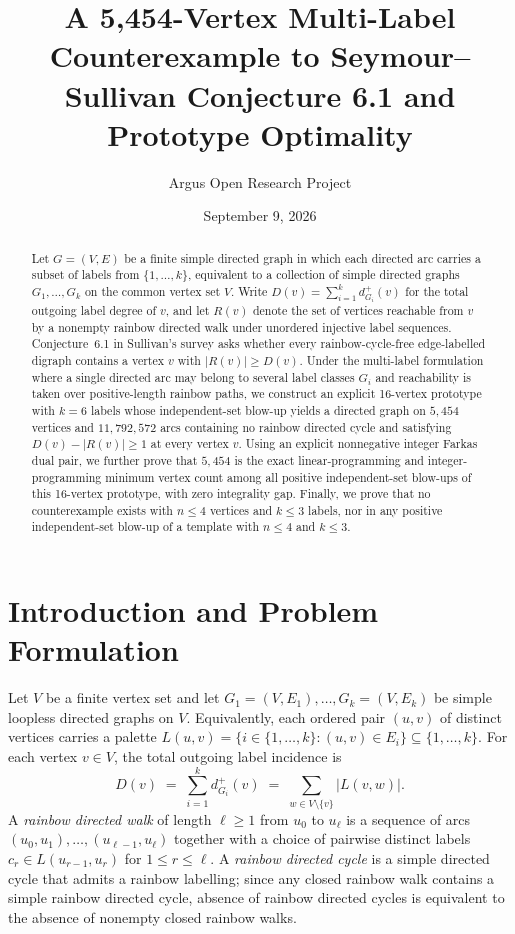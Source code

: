 \documentclass[10pt,reqno]{amsart}
\title[A 5,454-Vertex Counterexample to Sullivan's Conjecture 6.1]
{A 5,454-Vertex Multi-Label Counterexample to Seymour--Sullivan Conjecture 6.1 and Prototype Optimality}
\author{Argus Open Research Project}
\date{September 9, 2026}
\theoremstyle{definition}
\begin{document}
\begin{abstract}
Let $G=(V,E)$ be a finite simple directed graph in which each directed arc carries a subset of labels from $\{1,\dots,k\}$, equivalent to a collection of simple directed graphs $G_1,\dots,G_k$ on the common vertex set $V$. Write $D(v)=\sum_{i=1}^k d^+_{G_i}(v)$ for the total outgoing label degree of $v$, and let $R(v)$ denote the set of vertices reachable from $v$ by a nonempty rainbow directed walk under unordered injective label sequences. Conjecture~6.1 in Sullivan's survey asks whether every rainbow-cycle-free edge-labelled digraph contains a vertex $v$ with $|R(v)|\ge D(v)$. Under the multi-label formulation where a single directed arc may belong to several label classes $G_i$ and reachability is taken over positive-length rainbow paths, we construct an explicit 16-vertex prototype with $k=6$ labels whose independent-set blow-up yields a directed graph on $5{,}454$ vertices and $11{,}792{,}572$ arcs containing no rainbow directed cycle and satisfying $D(v)-|R(v)|\ge 1$ at every vertex $v$. Using an explicit nonnegative integer Farkas dual pair, we further prove that $5{,}454$ is the exact linear-programming and integer-programming minimum vertex count among all positive independent-set blow-ups of this 16-vertex prototype, with zero integrality gap. Finally, we prove that no counterexample exists with $n\le 4$ vertices and $k\le 3$ labels, nor in any positive independent-set blow-up of a template with $n\le 4$ and $k\le 3$.
\end{abstract}

\maketitle

\section{Introduction and Problem Formulation}

Let $V$ be a finite vertex set and let $G_1=(V,E_1),\dots,G_k=(V,E_k)$ be simple loopless directed graphs on $V$. Equivalently, each ordered pair $(u,v)$ of distinct vertices carries a palette $L(u,v)=\{i\in\{1,\dots,k\}: (u,v)\in E_i\}\subseteq\{1,\dots,k\}$. For each vertex $v\in V$, the total outgoing label incidence is
\[
  D(v) \;=\; \sum_{i=1}^k d^+_{G_i}(v) \;=\; \sum_{w\in V\setminus\{v\}} |L(v,w)|.
\]
A \emph{rainbow directed walk} of length $\ell\ge 1$ from $u_0$ to $u_\ell$ is a sequence of arcs $(u_0,u_1),\dots,(u_{\ell-1},u_\ell)$ together with a choice of pairwise distinct labels $c_r\in L(u_{r-1},u_r)$ for $1\le r\le\ell$. A \emph{rainbow directed cycle} is a simple directed cycle that admits a rainbow labelling; since any closed rainbow walk contains a simple rainbow directed cycle, absence of rainbow directed cycles is equivalent to the absence of nonempty closed rainbow walks.
\end{document}
